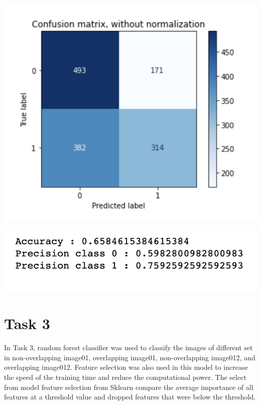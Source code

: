 \documentclass[12pt]{article}
\begin{document}
\begin{multicols*}{2}
\begin{center}
		\includegraphics[scale=0.5]{../screenshot/Overlapping-Elastic-results/cf.png}

		\includegraphics[scale=0.5]{../screenshot/Overlapping-Elastic-results/hand_score.png}
  \end{center}


  \section{Task 3}
  \hspace*{5mm} In Task 3, random forest classifier was used to classify the images of different set in non-overlapping image01, 
  overlapping image01, non-overlapping image012, and overlapping image012. Feature selection was also used in this model to increase
  the speed of the training time and reduce the computational power. The select from model feature selection from Sklearn compare the average
  importance of all features at a threshold value and dropped features that were below the threshold. 


\end{multicols*}
\end{document}
